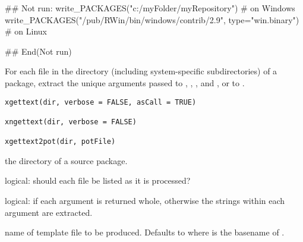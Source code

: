 %
\begin{Examples}
\begin{ExampleCode}
## Not run: 
write_PACKAGES("c:/myFolder/myRepository")  # on Windows
write_PACKAGES("/pub/RWin/bin/windows/contrib/2.9",
               type="win.binary")  # on Linux

## End(Not run)
\end{ExampleCode}
\end{Examples}
%
\begin{Description}\relax
For each file in the  directory (including system-specific
subdirectories) of a package, extract the unique arguments passed
to , , ,
 and , or to
.
\end{Description}
%
\begin{Usage}
\begin{verbatim}
xgettext(dir, verbose = FALSE, asCall = TRUE)

xngettext(dir, verbose = FALSE)

xgettext2pot(dir, potFile)
\end{verbatim}
\end{Usage}
%
\begin{Arguments}
\begin{ldescription}
\item[\code{dir}] the directory of a source package.
\item[\code{verbose}] logical: should each file be listed as it is processed?
\item[\code{asCall}] logical: if  each argument is returned whole,
otherwise the strings within each argument are extracted.

\item[\code{potFile}] name of  template file to be produced.
Defaults to  where
 is the basename of .
\end{ldescription}
\end{Arguments}
%
